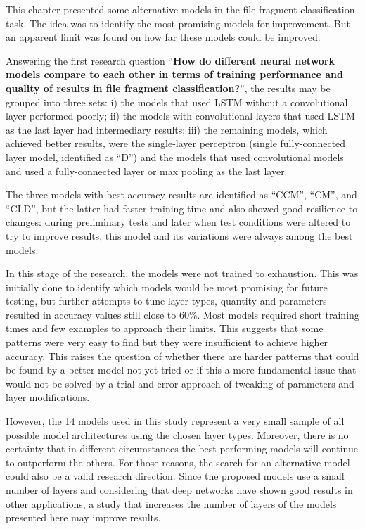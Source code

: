 This chapter presented some alternative models in the file fragment classification task. The idea was to identify the most promising models for improvement. But an apparent limit was found on how far these models could be improved.

Answering the first research question ``\textbf{How do different neural network models compare to each other in terms of training performance and quality of results in file fragment classification?}'', 
the results may be grouped into three sets: i) the models that used LSTM without a convolutional layer performed poorly; ii) the models with convolutional layers that used LSTM as the last layer had intermediary results; iii) the remaining models, which achieved better results, were the single-layer perceptron (single fully-connected layer model, identified as ``D'') and the models that used convolutional models and used a fully-connected layer or max pooling as the last layer.

The three models with best accuracy results are identified as ``CCM'', ``CM'', and ``CLD'', but the latter had faster training time and also showed good resilience to changes: during preliminary tests and later when test conditions were altered to try to improve results, this model and its variations were always among the best models.

In this stage of the research, the models were not trained to exhaustion.
This was initially done to identify which models would be most promising for future testing, but further attempts to tune layer types, quantity and parameters resulted in accuracy values still close to 60\%.
Most models required short training times and few examples to approach their limits.
This suggests that some patterns were very easy to find but they were insufficient to achieve higher accuracy.
This raises the question of whether there are harder patterns that could be found by a better model not yet tried or if this a more fundamental issue that would not be solved by a trial and error approach of tweaking of parameters and layer modifications.

However, the 14 models used in this study represent a very small sample of all possible model architectures using the chosen layer types. Moreover, there is no certainty that in different circumstances the best performing models will continue to outperform the others. For those reasons, the search for an alternative model could also be a valid research direction. Since the proposed models use a small number of layers and considering that deep networks have shown good results in other applications, a study that increases the number of layers of the models presented here may improve results.


